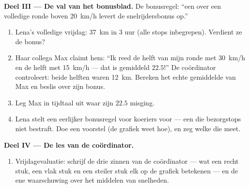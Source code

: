 \begin{problem}
\medskip\noindent\textbf{Deel III --- De val van het bonusblad.}
De bonusregel: ``een  over een volledige ronde
boven \qty{20}{km/h} levert de snelrijdersbonus op.''
\begin{enumerate}[resume]
  \item Lena's volledige vrijdag: \qty{37}{km} in $3$ uur (alle
        stops inbegrepen). Verdient ze de bonus?
  \item Haar collega Max claimt hem: ``Ik reed de helft van mijn
        ronde met \qty{30}{km/h} en de helft met \qty{15}{km/h} ---
        dat is gemiddeld $22.5$!'' De coördinator controleert: beide
        helften waren \qty{12}{km}. Bereken het echte gemiddelde van
        Max en beslis over zijn bonus.
  \item Leg Max in tijdtaal uit waar zijn $22.5$ misging.
  \item Lena stelt een eerlijker bonusregel voor koeriers voor ---
        een die bezorgstops niet bestraft. Doe een voorstel (de
        grafiek weet hoe), en zeg welke  die
        meet.
\end{enumerate}

\medskip\noindent\textbf{Deel IV --- De les van de coördinator.}
\begin{enumerate}[resume]
  \item Vrijdagevaluatie: schrijf de drie zinnen van de coördinator
        --- wat een recht stuk, een vlak stuk en een steiler stuk
        elk op de grafiek betekenen --- en de ene waarschuwing over
        het middelen van snelheden.
\end{enumerate}
\end{problem}
